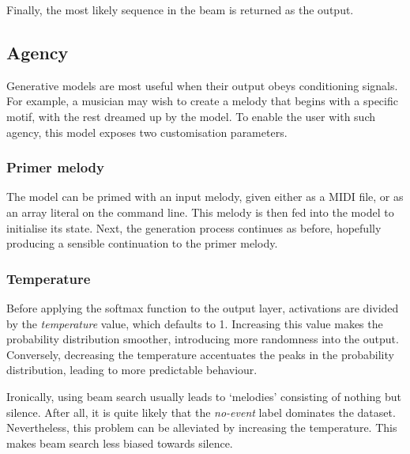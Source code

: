 \documentclass[../../report.tex]{subfiles}
\begin{document}
Finally, the most likely sequence in the beam is returned as the output.

\subsection{Agency}

Generative models are most useful when their output obeys conditioning signals.
For example, a musician may wish to create a melody that begins with a specific
motif, with the rest dreamed up by the model. To enable the user with such
agency, this model exposes two customisation parameters.

\subsubsection{Primer melody}
The model can be primed with an input melody, given either as a MIDI file, or as
an array literal on the command line. This melody is then fed into the model to
initialise its state. Next, the generation process continues as before,
hopefully producing a sensible continuation to the primer melody.

\subsubsection{Temperature}
Before applying the softmax function to the output layer, activations are
divided by the \emph{temperature} value, which defaults to 1. Increasing this
value makes the probability distribution smoother, introducing more randomness
into the output. Conversely, decreasing the temperature accentuates the peaks in
the probability distribution, leading to more predictable behaviour.

Ironically, using beam search usually leads to `melodies' consisting of nothing
but silence. After all, it is quite likely that the \emph{no-event} label
dominates the dataset. Nevertheless, this problem can be alleviated by
increasing the temperature. This makes beam search less biased towards silence.
\end{document}
